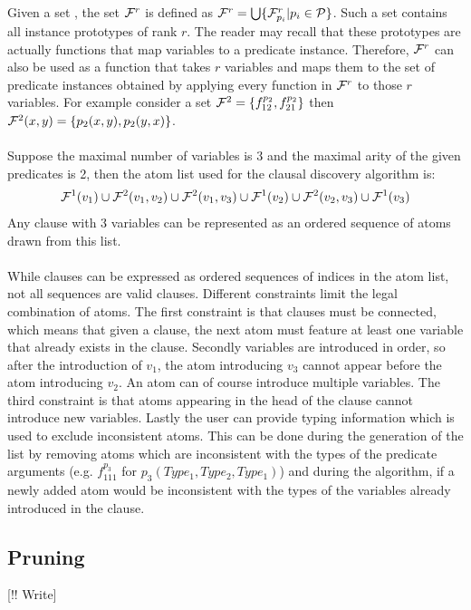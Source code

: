 Given a set , the set $\mathcal{F}^r$ is defined as $\mathcal{F}^r = \bigcup \{\mathcal{F}^r_{p_i} | p_i \in \mathcal{P}\}$.
Such a set contains all instance prototypes of rank $r$.
The reader may recall that these prototypes are actually functions that map variables to a predicate instance.
Therefore, $\mathcal{F}^r$ can also be used as a function that takes $r$ variables and maps them to the set of predicate instances obtained by applying every function in $\mathcal{F}^r$ to those $r$ variables.
For example consider a set $\mathcal{F}^2 = \{f^{p_2}_{12}, f^{p_2}_{21}\}$ then $\mathcal{F}^2(x, y) = \{p_2(x, y), p_2(y, x)\}$.
\\\\
Suppose the maximal number of variables is 3 and the maximal arity of the given predicates is 2, then the atom list used for the clausal discovery algorithm is:
\begin{align*}
\mathcal{F}^1(v_1) \cup \mathcal{F}^2(v_1, v_2) \cup \mathcal{F}^2(v_1, v_3) \cup \mathcal{F}^1(v_2) \cup \mathcal{F}^2(v_2, v_3) \cup \mathcal{F}^1(v_3)
\end{align*}
Any clause with 3 variables can be represented as an ordered sequence of atoms drawn from this list.
\\\\
While clauses can be expressed as ordered sequences of indices in the atom list, not all sequences are valid clauses.
Different constraints limit the legal combination of atoms.
The first constraint is that clauses must be connected, which means that given a clause, the next atom must feature at least one variable that already exists in the clause.
Secondly variables are introduced in order, so after the introduction of $v_1$, the atom introducing $v_3$ cannot appear before the atom introducing $v_2$.
An atom can of course introduce multiple variables.
The third constraint is that atoms appearing in the head of the clause cannot introduce new variables.
Lastly the user can provide typing information which is used to exclude inconsistent atoms.
This can be done during the generation of the list by removing atoms which are inconsistent with the types of the predicate arguments (e.g. $f^{p_3}_{111}$ for $p_3(Type_1, Type_2, Type_1)$) and during the algorithm, if a newly added atom would be inconsistent with the types of the variables already introduced in the clause.

\subsection{Pruning}
[!! Write]

